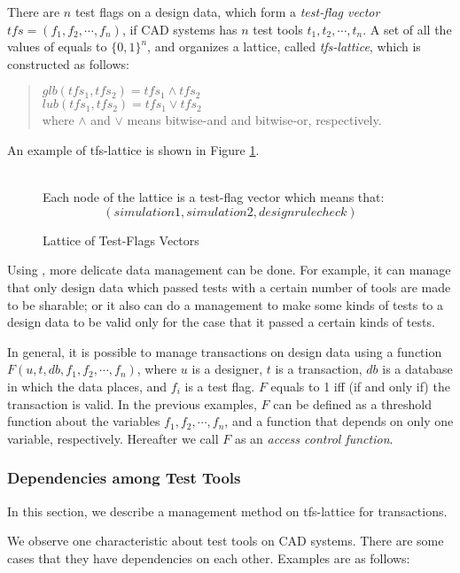 There are $n$ test flags on a design data, which form a {\em test-flag
vector} $tfs = (f_1, f_2, \cdots, f_n)$, if CAD systems has $n$ test
tools $t_1, t_2, \cdots, t_n$.
A set of all the values of \tfs equals to $\{0,1\}^n$, and 
organizes a lattice, called {\em tfs-lattice}, which is constructed as
follows:
\begin{quote}
$glb(tfs_1, tfs_2) = tfs_1 \wedge tfs_2$\\
$lub(tfs_1, tfs_2) = tfs_1 \vee tfs_2$\\
where $\wedge$ and $\vee$ means bitwise-and and bitwise-or, respectively.
\end{quote}
An example of tfs-lattice is shown in Figure \ref{fig:tfs-lattice}. 
\begin{figure}
\begin{center}

\\Each node of the lattice is a test-flag vector which means that: 
\[ (simulation1, simulation2, design rule check) \]
\caption{Lattice of Test-Flags Vectors}
\label{fig:tfs-lattice}
\end{center}
\end{figure}

Using \tfs, more delicate data management can be done.
For example, it can manage that only design data which passed tests with a 
certain number of tools are made to be sharable; 
or it also can do a management to make some kinds of tests to 
a design data to be valid only for the case that it passed a certain 
kinds of tests.

In general, it is possible to manage transactions on design
data using a function $F(u, t, db, f_1, f_2, \cdots, f_n)$,
where $u$ is a designer, $t$ is a transaction, $db$ is a database in which
the data places, and $f_i$ is a test flag. 
$F$ equals to 1 iff (if and only if) the transaction is valid.
In the previous examples, $F$ can be defined as a threshold function about
the variables $f_1, f_2, \cdots, f_n$, and a
function that depends on only one variable, respectively.
Hereafter we call $F$ as an {\em access control function}.

\subsubsection{Dependencies among Test Tools}
\label{subsubsec:testtooldep}
In this section, we describe a management method on tfs-lattice for 
transactions.

We observe one characteristic about test tools on CAD systems.
There are some cases that they have dependencies on each other.
Examples are as follows:

